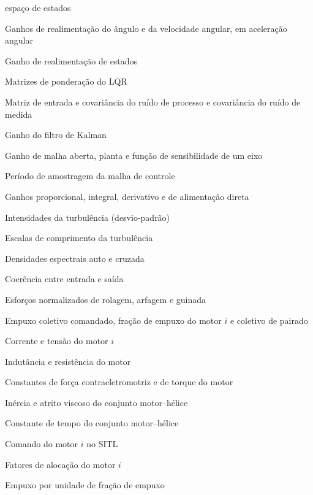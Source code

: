 \begin{simbolos}
        espaço de estados
    \item[$k_\theta, k_\omega$] Ganhos de realimentação do ângulo e da
        velocidade angular, em aceleração angular
    \item[$\matriz{K}$] Ganho de realimentação de estados
    \item[$\matriz{Q}, \matriz{R}_u$] Matrizes de ponderação do LQR
    \item[$\matriz{G}, \matriz{W}, \matriz{V}$] Matriz de entrada e
        covariância do ruído de processo e covariância do ruído de medida
    \item[$\matriz{L}$] Ganho do filtro de Kalman
    \item[$L(z), P(z), S(z)$] Ganho de malha aberta, planta e função de
        sensibilidade de um eixo
    \item[$T_s$] Período de amostragem da malha de controle
    \item[$k_P, k_I, k_D, k_{FF}$] Ganhos proporcional, integral, derivativo
        e de alimentação direta
    \item[$\sigma_u, \sigma_v$] Intensidades da turbulência (desvio-padrão)
    \item[$L_u, L_v$] Escalas de comprimento da turbulência
    \item[$G_{uu}, G_{uy}$] Densidades espectrais auto e cruzada
    \item[$\gamma^2_{uy}$] Coerência entre entrada e saída
    \item[$\vetor{u} = {[u_x\ u_y\ u_z]}^{\mathsf{T}}$] Esforços normalizados
        de rolagem, arfagem e guinada
    \item[$t_c$, $t_i$, $t_h$] Empuxo coletivo comandado, fração de empuxo
        do motor $i$ e coletivo de pairado
    \item[$I_i$, $V_{m,i}$] Corrente e tensão do motor $i$
    \item[$L_m, R_m$] Indutância e resistência do motor
    \item[$K_e, K_\tau$] Constantes de força contraeletromotriz e de torque
        do motor
    \item[$J_m, B_m$] Inércia e atrito viscoso do conjunto motor--hélice
    \item[$\tau_m$] Constante de tempo do conjunto motor--hélice
    \item[$c_i$] Comando do motor $i$ no SITL
    \item[$f_{x,i}, f_{y,i}, f_{z,i}$] Fatores de alocação do motor $i$
    \item[$k_t$] Empuxo por unidade de fração de empuxo

\end{simbolos}
